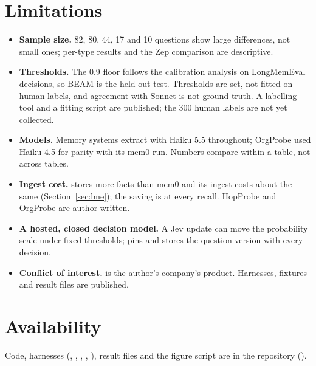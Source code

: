 \section{Limitations}\label{sec:limits}
\begin{itemize}
\item \textbf{Sample size.} 82, 80, 44, 17 and 10 questions show large differences, not small ones; per-type results and
the Zep comparison are descriptive.
\item \textbf{Thresholds.} The 0.9 floor follows the calibration analysis on LongMemEval decisions, so BEAM is the
held-out test. Thresholds are set, not fitted on human labels, and agreement with Sonnet is not ground truth. A
labelling tool and a fitting script are published; the 300 human labels are not yet collected.
\item \textbf{Models.} Memory systems extract with Haiku 5.5 throughout; OrgProbe used Haiku 4.5 for parity with its
mem0 run. Numbers compare within a table, not across tables.
\item \textbf{Ingest cost.} \mx{} stores more facts than mem0 and its ingest costs about the same (Section~\ref{sec:lme});
the saving is at every recall. HopProbe and OrgProbe are author-written.
\item \textbf{A hosted, closed decision model.} A Jev update can move the probability scale under fixed thresholds;
\mx{} pins  and stores the question version with every decision.
\item \textbf{Conflict of interest.} \mx{} is the author's company's product. Harnesses, fixtures and result files are
published.
\end{itemize}



\section*{Availability}
Code, harnesses (, , , ,
), result files and the figure script
are in the \mx{} repository ().

